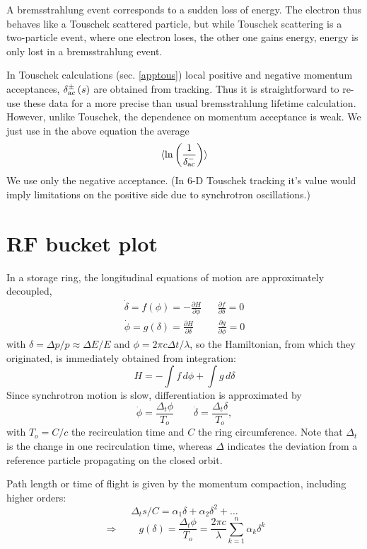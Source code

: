 \documentclass[12pt]{article}
\newcommand\beq{\begin{equation}}
\newcommand\eeq{\end{equation}}
\begin{document}
A bremsstrahlung event corresponds to a sudden loss of energy. The electron thus behaves like a Touschek scattered particle, but while Touschek scattering is a two-particle event, where one electron loses, the other one gains energy, energy is only lost in a bremsstrahlung event.

In Touschek calculations (sec. \ref{apptous}) local positive and negative momentum acceptances, $\delta_{\rm ac}^{\pm}\,(s)$ are obtained from tracking. Thus it is straightforward to re-use these data for a more precise than usual bremsstrahlung lifetime calculation. However, unlike Touschek, the dependence on momentum acceptance is weak. We just use in the  above equation the average
\beq
\langle \ln\left(\frac{1}{\delta_{\rm ac}^{-}}\right) \rangle
\eeq
We use only the negative acceptance. (In 6-D Touschek tracking it's value would imply limitations on the positive side due to synchrotron oscillations.)

\section{\label{appbucket}RF bucket plot}
In a storage ring, the longitudinal equations of motion are approximately decoupled,
\begin{eqnarray}
\dot{\delta}=f(\phi)=-\frac{\partial H}{\partial \phi} & & \frac{\partial f}{\partial \delta}=0 \\
\dot{\phi}=g(\delta)=\frac{\partial H}{\partial \delta} & & \frac{\partial g}{\partial \phi}=0
\end{eqnarray}
with $\delta=\Delta p/p\approx \Delta E/E$ and $\phi=2\pi c \Delta t/\lambda$, so the Hamiltonian, from which they originated, is immediately obtained from integration:
\beq
H = -\int f\, d\phi + \int g \, d \delta
\eeq
Since synchrotron motion is slow, differentiation is approximated by
\beq
\dot{\phi}=\frac{\Delta_t \phi}{T_o}\qquad \dot{\delta}=\frac{\Delta_t \delta}{T_o},
\eeq
with $T_o=C/c$ the recirculation time and $C$ the ring circumference. Note that $\Delta_t$ is the change in one recirculation time, whereas $\Delta$ indicates the deviation from a reference particle propagating on the closed orbit.

Path length or time of flight is given by the momentum compaction, including higher orders:
\beq
\Delta_t s/C = \alpha_1 \delta + \alpha_2 \delta^2+ \dots
\eeq
\beq
\Longrightarrow\qquad g(\delta)=\frac{\Delta_t \phi}{T_o} = \frac{2\pi c}{\lambda}\sum_{k=1}^{n} \alpha_k\delta^k
\eeq
\end{document}
